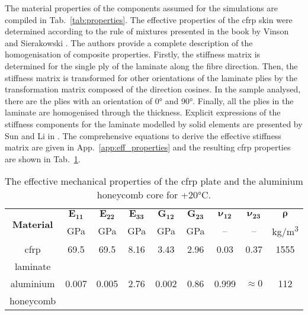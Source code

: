 The material properties of the components assumed for the simulations are compiled in Tab.~\ref{tab:properties}.
The effective properties of the \ac{cfrp} skin were determined according to the rule of mixtures presented in the book by Vinson and Sierakowski \cite{vinson1993behavior}.
The authors provide a complete description of the homogenisation of composite properties.
Firstly, the stiffness matrix is determined for the single ply of the laminate along the fibre direction.
Then, the stiffness matrix is transformed for other orientations of the laminate plies by the transformation matrix composed of the direction cosines.
In the sample analysed, there are the plies with an orientation of \ang{0} and \ang{90}.
Finally, all the plies in the laminate are homogenised through the thickness.
Explicit expressions of the stiffness components for the laminate modelled by solid elements are presented by Sun and Li in \cite{sun1988three}.
The comprehensive equations to derive the effective stiffness matrix are given in App.~\ref{app:eff_properties} and the resulting \ac{cfrp} properties are shown in Tab.~\ref{tab:properties_eff}.
\begin{table}[H]
	\centering
	\small
	\tabcolsep=0.25cm
	\caption{\label{tab:properties_eff} The effective mechanical properties of the \ac{cfrp} plate and the aluminium honeycomb core for +20\unit{\degreeCelsius}.}
	\begin{tabular}{ccccccccc}
		\toprule
		\multirow{2}{*}{\textbf{Material}} & \(\boldsymbol{E_{11}}\) & \(\boldsymbol{E_{22}}\) & \(\boldsymbol{E_{33}}\) & \(\boldsymbol{G_{12}}\) & \(\boldsymbol{G_{23}}\) & \(\boldsymbol{\nu_{12}}\)	& \(\boldsymbol{\nu_{23}}\) & \(\boldsymbol{\rho}\) \\
		& \unit{\giga\pascal} & \unit{\giga\pascal} & \unit{\giga\pascal} & \unit{\giga\pascal} & \unit{\giga\pascal} & -- & -- & \unit[per-mode = symbol]
		{\kilogram\per\cubic\metre}\\
		\midrule
		\ac{cfrp} & 69.5 & 69.5 & 8.16 & 3.43 & 2.96 & 0.03 & 0.37 & 1555\\
		laminate & & & & & & & &\\
		\midrule
		aluminium & 0.007 & 0.005 & 2.76 & 0.002 & 0.86 & 0.999 & \(\approx0\) & 112\\
		honeycomb & & & & & & & &\\
		\bottomrule
	\end{tabular}
\end{table}
%